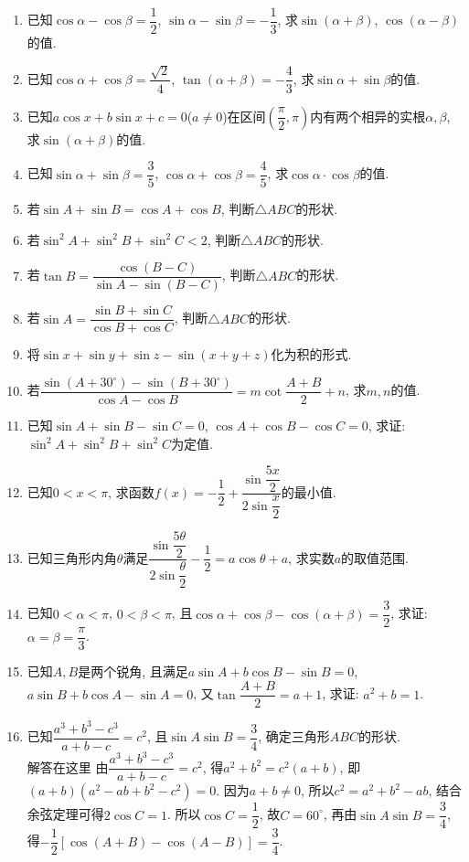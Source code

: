 \documentclass[10pt,a4paper]{article}
\begin{document}
\begin{enumerate}[1.]
\item 已知$\cos \alpha -\cos \beta =\dfrac 12$, $\sin \alpha -\sin \beta =-\dfrac 13$, 求$\sin (\alpha +\beta)$, $\cos (\alpha -\beta)$的值.
\item 已知$\cos \alpha +\cos \beta =\dfrac{\sqrt 2}4$, $\tan (\alpha +\beta)=-\dfrac 43$, 求$\sin \alpha +\sin \beta$的值.
\item 已知$a\cos x+b\sin x+c=0$($a\ne 0$)在区间$(\dfrac{\pi}2,\pi)$内有两个相异的实根$\alpha ,\beta$, 求$\sin (\alpha +\beta)$的值.
\item 已知$\sin \alpha +\sin \beta =\dfrac 35$, $\cos \alpha +\cos \beta =\dfrac 45$, 求$\cos \alpha \cdot \cos \beta$的值.
\item 若$\sin A+\sin B=\cos A+\cos B$, 判断$\triangle ABC$的形状.
\item 若$\sin ^2A+\sin ^2B+\sin ^2C<2$, 判断$\triangle ABC$的形状.
\item 若$\tan B=\dfrac{\cos (B-C)}{\sin A-\sin (B-C)}$, 判断$\triangle ABC$的形状.
\item 若$\sin A=\dfrac{\sin B+\sin C}{\cos B+\cos C}$, 判断$\triangle ABC$的形状.
\item 将$\sin x+\sin y+\sin z-\sin (x+y+z)$化为积的形式.
\item 若$\dfrac{\sin (A+30^\circ)-\sin (B+30^\circ)}{\cos A-\cos B}=m\cot \dfrac{A+B}2+n$, 求$m,n$的值.
\item 已知$\sin A+\sin B-\sin C=0$, $\cos A+\cos B-\cos C=0$, 求证: $\sin ^2A+\sin ^2B+\sin ^2C$为定值.
\item 已知$0<x<\pi$, 求函数$f(x)=-\dfrac 12+\dfrac{\sin \dfrac{5x}2}{2\sin \dfrac x2}$的最小值.
\item 已知三角形内角$\theta$满足$\dfrac{\sin \dfrac{5\theta}2}{2\sin \dfrac{\theta}2}-\dfrac 12=a\cos \theta +a$, 求实数$a$的取值范围.
\item 已知$0<\alpha <\pi$, $0<\beta <\pi$, 且$\cos \alpha +\cos \beta -\cos (\alpha +\beta)=\dfrac 32$, 求证: $\alpha =\beta =\dfrac{\pi}3$.
\item 已知$A,B$是两个锐角, 且满足$a\sin A+b\cos B-\sin B=0$, $a\sin B+b\cos A-\sin A=0$, 又$\tan \dfrac{A+B}2=a+1$, 求证: $a^2+b=1$.
\item 已知$\dfrac{a^3+b^3-c^3}{a+b-c}=c^2$, 且$\sin A\sin B=\dfrac 34$, 确定三角形$ABC$的形状.\\
解答在这里  由$\dfrac{a^3+b^3-c^3}{a+b-c}=c^2$, 得$a^2+b^2=c^2(a+b)$, 即$(a+b)(a^2-ab+b^2-c^2)=0$.
因为$a+b\ne 0$, 所以$c^2=a^2+b^2-ab$, 结合余弦定理可得$2\cos C=1$.
所以$\cos C=\dfrac 12$, 故$C=60^{\circ}$, 再由$\sin A\sin B=\dfrac 34$, 得$-\dfrac 12[\cos (A+B)-\cos (A-B)]=\dfrac 34$.

\end{enumerate}
\end{document}
